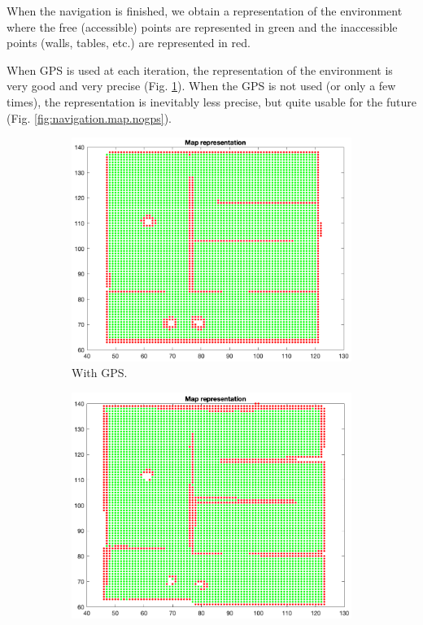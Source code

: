 \documentclass[a4paper, 10pt, conference]{ieeeconf}
\begin{document}
    When the navigation is finished, we obtain a representation of the environment where the free (accessible) points are represented in green and the inaccessible points (walls, tables, etc.) are represented in red.
    
    When GPS is used at each iteration, the representation of the environment is very good and very precise (Fig. \ref{fig:navigation.map.gps}). When the GPS is not used (or only a few times), the representation is inevitably less precise, but quite usable for the future (Fig. \ref{fig:navigation.map.nogps}).
    
    \begin{figure}[!h]
        \centering
        \begin{subfigure}[b]{0.23\textwidth}
            \centering
            \includegraphics[width=\textwidth]{resources/png/map-gps.png}
            \caption{With GPS.}
            \label{fig:navigation.map.gps}
        \end{subfigure}
        \hfill
        \begin{subfigure}[b]{0.23\textwidth}
            \centering
            \includegraphics[width=\textwidth]{resources/png/map-nogps.png}

\end{subfigure}
\end{figure}
\end{document}
